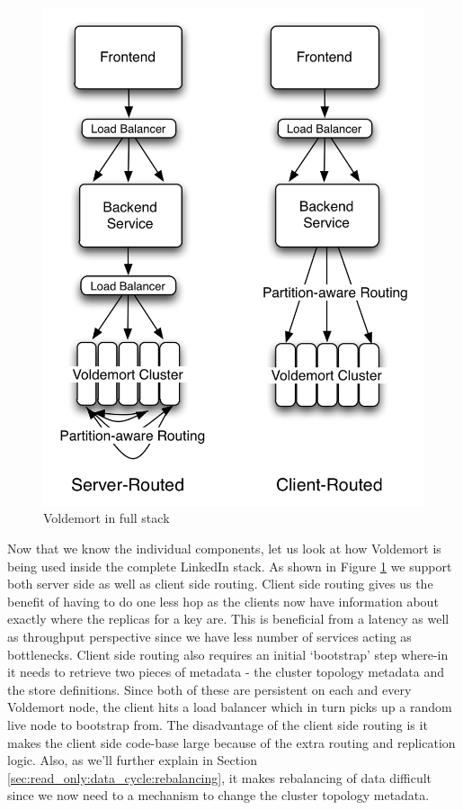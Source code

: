 \documentclass[10pt,twocolumn,preprint,natbib,authoryear]{sigplanconf}
\begin{document}
\begin{figure}
  \centering
    \includegraphics[scale=0.60]{fullstack.png}
  \caption{Voldemort in full stack}
  \label{fullstack}
\end{figure}


\noindent 
Now that we know the individual components, let us look at how Voldemort is being used inside the complete LinkedIn stack. As shown in Figure \ref{fullstack} we support both server side as well as client side routing. Client side routing gives us the benefit of having to do one less hop as the clients now have information about exactly where the replicas for a key are. This is beneficial from a latency as well as throughput perspective since we have less number of services acting as bottlenecks. Client side routing also requires an initial `bootstrap' step where-in it needs to retrieve two pieces of metadata - the cluster topology metadata and the store definitions. Since both of these are persistent on each and every Voldemort node, the client hits a load balancer which in turn picks up a random live node to bootstrap from. The disadvantage of the client side routing is it makes the client side code-base large because of the extra routing and replication logic. Also, as we'll further explain in Section \ref{sec:read_only:data_cycle:rebalancing}, it makes rebalancing of data difficult since we now need to a mechanism to change the cluster topology metadata. 
\end{document}
